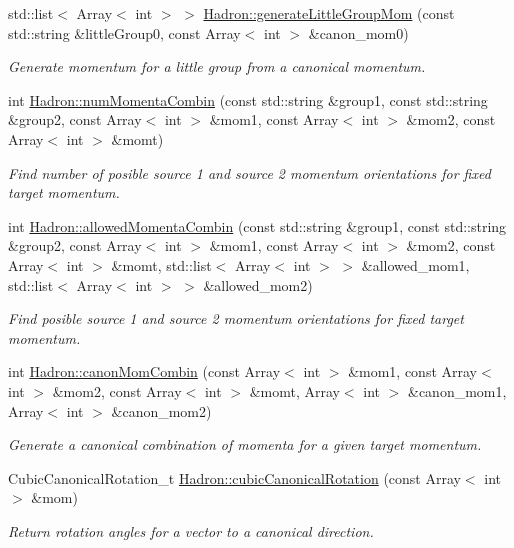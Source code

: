 \begin{DoxyCompactItemize}
std\+::list$<$ Array$<$ int $>$ $>$ \mbox{\hyperlink{namespaceHadron_a12d4f9d40cac2700ebb7a7420f20987b}{Hadron\+::generate\+Little\+Group\+Mom}} (const std\+::string \&little\+Group0, const Array$<$ int $>$ \&canon\+\_\+mom0)
\begin{DoxyCompactList}\small\item\em Generate momentum for a little group from a canonical momentum. \end{DoxyCompactList}\item 
int \mbox{\hyperlink{namespaceHadron_afc213211f9c79372b449aac381596d1c}{Hadron\+::num\+Momenta\+Combin}} (const std\+::string \&group1, const std\+::string \&group2, const Array$<$ int $>$ \&mom1, const Array$<$ int $>$ \&mom2, const Array$<$ int $>$ \&momt)
\begin{DoxyCompactList}\small\item\em Find number of posible source 1 and source 2 momentum orientations for fixed target momentum. \end{DoxyCompactList}\item 
int \mbox{\hyperlink{namespaceHadron_a9aa2554e3522f9947be804d36603b887}{Hadron\+::allowed\+Momenta\+Combin}} (const std\+::string \&group1, const std\+::string \&group2, const Array$<$ int $>$ \&mom1, const Array$<$ int $>$ \&mom2, const Array$<$ int $>$ \&momt, std\+::list$<$ Array$<$ int $>$ $>$ \&allowed\+\_\+mom1, std\+::list$<$ Array$<$ int $>$ $>$ \&allowed\+\_\+mom2)
\begin{DoxyCompactList}\small\item\em Find posible source 1 and source 2 momentum orientations for fixed target momentum. \end{DoxyCompactList}\item 
int \mbox{\hyperlink{namespaceHadron_ab874ef7e96f2c243de41a6ef639bf3c3}{Hadron\+::canon\+Mom\+Combin}} (const Array$<$ int $>$ \&mom1, const Array$<$ int $>$ \&mom2, const Array$<$ int $>$ \&momt, Array$<$ int $>$ \&canon\+\_\+mom1, Array$<$ int $>$ \&canon\+\_\+mom2)
\begin{DoxyCompactList}\small\item\em Generate a canonical combination of momenta for a given target momentum. \end{DoxyCompactList}\item 
Cubic\+Canonical\+Rotation\+\_\+t \mbox{\hyperlink{namespaceHadron_ada689173e1553ad2f452af24028eae2f}{Hadron\+::cubic\+Canonical\+Rotation}} (const Array$<$ int $>$ \&mom)
\begin{DoxyCompactList}\small\item\em Return rotation angles for a vector to a canonical direction. \end{DoxyCompactList}\item 

\end{DoxyCompactItemize}
